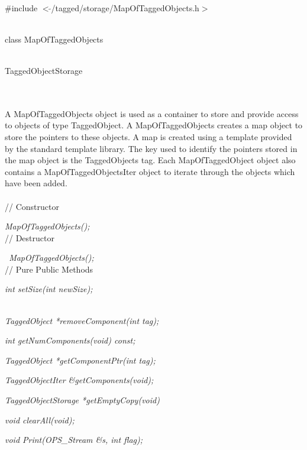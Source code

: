
   \\
\#include $<\tilde{ }$/tagged/storage/MapOfTaggedObjects.h$>$ 


  \\
class MapOfTaggedObjects  


 \\
 {TaggedObjectStorage} 

\indent{} \\

  \\
\indent A MapOfTaggedObjects object is used as a container to store and
provide access to objects of type TaggedObject. A MapOfTaggedObjects
creates a map object to store the pointers to these objects. A map is
created using a template provided by the standard template
library. The key used to identify the pointers stored in the map
object is the TaggedObjects tag. Each MapOfTaggedObject object also contains
a MapOfTaggedObjectsIter object to iterate through the objects which
have been added.\\ 

  \\
// Constructor  

{\em MapOfTaggedObjects();} \\

// Destructor 

{\em  ~MapOfTaggedObjects();} \\  

// Pure Public Methods 

{\em int  setSize(int newSize);}

\\
{\em TaggedObject *removeComponent(int tag);}

{\em int getNumComponents(void) const;}

{\em TaggedObject *getComponentPtr(int tag);}

{\em TaggedObjectIter \&getComponents(void);}

{\em TaggedObjectStorage *getEmptyCopy(void)}

{\em void clearAll(void);}

{\em void Print(OPS_Stream \&s, int flag);}


